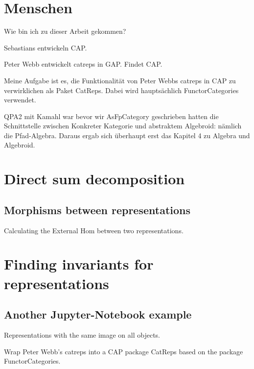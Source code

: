 \documentclass[12pt,compress]{beamer}
\begin{document}





\section{Menschen}

Wie bin ich zu dieser Arbeit gekommen?

Sebastians entwickeln CAP.

Peter Webb entwickelt catreps in GAP. Findet CAP.

Meine Aufgabe ist es, die Funktionalität von Peter Webbs catreps in CAP
zu verwirklichen als Paket CatReps. Dabei wird hauptsächlich FunctorCategories
verwendet.

QPA2 mit Kamahl war bevor wir AsFpCategory geschrieben hatten die Schnittstelle zwischen
Konkreter Kategorie und abstraktem Algebroid: nämlich die Pfad-Algebra. Daraus ergab sich
überhaupt erst das Kapitel 4 zu Algebra und Algebroid.


\section{Direct sum decomposition}

\subsection{Morphisms between representations}

\begin{frame}
Calculating the External Hom between two representations.
\end{frame}

\section{Finding invariants for representations}

\subsection{Another Jupyter-Notebook example}

\begin{frame}
Representations with the same image on all objects.
\end{frame}



Wrap Peter Webb's catreps into a CAP package CatReps based on the package FunctorCategories.
\end{document}
